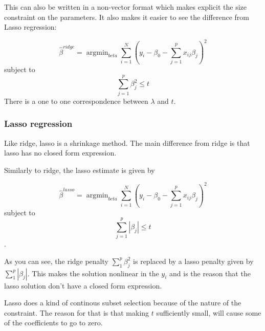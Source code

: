 This can also be written in a non-vector format which makes 
explicit the size constraint on the parameters. 
It also makes it easier to see the difference from Lasso regression:

\begin{equation}
	\hat{\beta}^{ridge} = \operatorname{argmin}_{beta} 
							\sum\limits_{i=1}^N \left(y_i - \beta_0
							-\sum\limits_{j=1}^p x_{ij}\beta_j\right)^2
\end{equation}
subject to
\begin{equation}
	\sum\limits_{j=1}^p \beta_j^2 \leq t
\end{equation}
There is a one to one correspondence between \(\lambda\) and \(t\).
\cite{IntroStatistics} 

\subsubsection{Lasso regression}
Like ridge, lasso is a shrinkage method. The main difference from 
ridge is that lasso has no closed form expression. ~\cite{IntroStatistics} 

Similarly to ridge, the lasso estimate is given by

\begin{equation}
	\hat{\beta}^{lasso} = \operatorname{argmin}_{beta} 
							\sum\limits_{i=1}^N \left(y_i - \beta_0
							-\sum\limits_{j=1}^p x_{ij}\beta_j\right)^2
\end{equation}
subject to
\begin{equation}
	\sum\limits_{j=1}^p |\beta_j| \leq t
\end{equation}.

As you can see, the ridge penalty \(\sum_1^p \beta_j^2\) is replaced 
by a lasso penalty given by \(\sum_1^p |\beta_j|\). 
This makes the solution nonlinear in the \(y_i\) and is the reason
that the lasso solution don't have a closed form expression.

Lasso does a kind of continous subset selection because of the nature of 
the constraint. The reason for that is that making \(t\) sufficiently small,
will cause some of the coefficients to go to zero. 







